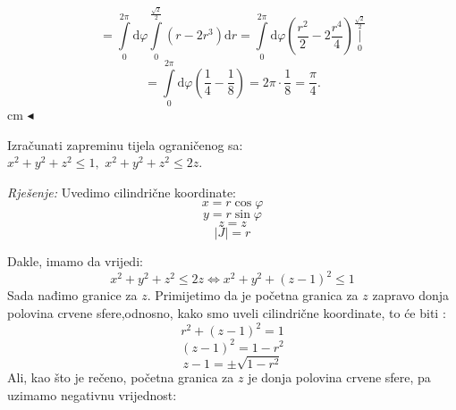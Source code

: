 \documentclass[a4paper,11pt]{article}
\begin{document}
$$=\int\limits_{0}^{2\pi} \mathrm d\varphi \int\limits_{0}^{\frac{\sqrt{2}}{2} } (r -2r^3  )\mathrm dr     =  \int\limits_{0}^{2\pi} \mathrm d\varphi \left( \frac{ r^2  }{2} - 2\frac{ r^4  }{4}\right)\underset{0}{\overset{ \frac{\sqrt{2}}{2} }{ \bigg\vert}}   $$
$$= \int\limits_{0}^{2\pi} \mathrm d\varphi\left(\frac{ 1  }{4} - \frac{ 1  }{8}\right) = 2\pi \cdot \frac{ 1  }{8} = \frac{\pi}{4} .$$
 cm $\blacktriangleleft$ \\


















\begin{tcolorbox}[colback=brown!35!white,colframe=white!75!white,title= $$\bullet \bullet \bullet$$]
         \begin{zadatak}
Izračunati zapreminu tijela ograničenog sa:\\
$   x^2 + y^2 + z^2 \leq 1  ,$ $  x^2 + y^2 + z^2 \leq 2z .$
\end{zadatak}
\end{tcolorbox}
\emph{Rješenje: }
Uvedimo cilindrične koordinate:
$$x= r\cos{\varphi}$$
$$y= r\sin{\varphi}$$
$$z=z$$
$$|J|= r$$
\begin{center}
\end{center}
Dakle, imamo da vrijedi:
$$ x^2 + y^2 + z^2 \leq 2z \Longleftrightarrow x^2 + y^2 + (z-1)^2 \leq 1$$
Sada nađimo granice za $z$. Primijetimo da je početna granica za $z$ zapravo donja polovina crvene sfere,odnosno, kako smo uveli cilindrične koordinate, to će biti :
$$r^2 + (z-1)^2 = 1$$
$$ (z-1)^2 = 1 - r^2  $$
$$z -1 = \pm \sqrt{1 - r^2}$$
Ali, kao što je rečeno, početna granica za $z$ je donja polovina crvene sfere, pa uzimamo negativnu vrijednost:
\end{document}
